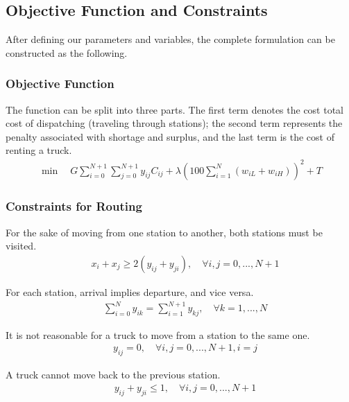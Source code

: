 \documentclass[a4paper, 12pt]{article}%
\theoremstyle{definition}
\begin{document}
\subsection{Objective Function and Constraints}

After defining our parameters and variables, the complete formulation can be constructed as the following.
    
\subsubsection{Objective Function}

\noindent The function can be split into three parts. The first term denotes the cost total cost of dispatching (traveling through stations); the second term represents the penalty associated with shortage and surplus, and the last term is the cost of renting a truck.
\begin{align}
    \min \quad G \sum_{i = 0}^{N+1} \sum_{j = 0}^{N+1} y_{ij} C_{ij} + \lambda (100 \sum_{i = 1}^N (w_{iL} + w_{iH}))^2 + T
\end{align}

\subsubsection{Constraints for Routing}

\noindent For the sake of moving from one station to another, both stations must be visited. 
\begin{align}
    \quad  x_i + x_j \geq 2(y_{ij} + y_{ji}), \quad  \forall i, j = 0,...,N+1
\end{align}

\noindent For each station, arrival implies departure, and vice versa.
\begin{align}
    \quad  \sum_{i = 0}^N y_{ik} = \sum_{i = 1}^{N+1} y_{kj}, \quad  \forall k = 1,...,N
\end{align}

\noindent It is not reasonable for a truck to move from a station to the same one.
\begin{align}
    \quad  y_{ij} = 0, \quad  \forall i,j = 0,...,N+1, i = j
\end{align}

\noindent A truck cannot move back to the previous station.
\begin{align}
    \quad  y_{ij} + y_{ji} \leq 1, \quad  \forall i, j = 0,...,N+1
\end{align}
\end{document}
